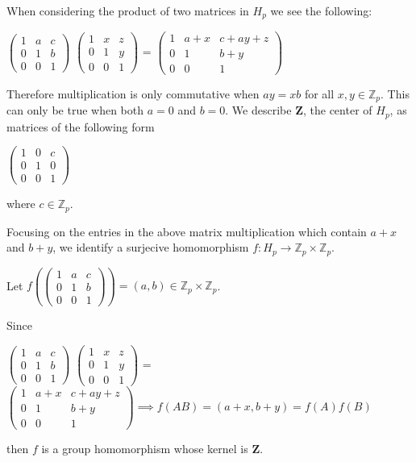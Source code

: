 \documentclass{article}
\theoremstyle{plain} %
\theoremstyle{definition} %
\newcommand{\bZ}{\mathbb{Z}}
\newcommand{\fZ}{\mathbf{Z}}
\begin{document}
When considering the product of two matrices in $H_p$ we see the following:
\begin{center}
    $\begin{pmatrix}
        1 & a & c \\
        0 & 1 & b \\
        0 & 0 & 1
    \end{pmatrix}$
    $\begin{pmatrix}
        1 & x & z \\
        0 & 1 & y \\
        0 & 0 & 1
    \end{pmatrix}$ =
    $\begin{pmatrix}
        1 & a+x & c+ay+z \\
        0 & 1 & b+y \\
        0 & 0 & 1
    \end{pmatrix}$ 
\end{center}
Therefore multiplication is only commutative when $ay=xb$ for all $x,y \in \bZ_p$. 
This can only be true when both $a=0$ and $b=0$.
We describe $\fZ$, the center of $H_p$, as matrices of the following form
\begin{center}
    $\begin{pmatrix}
        1 & 0 & c \\
        0 & 1 & 0 \\
        0 & 0 & 1
    \end{pmatrix}$
\end{center}
where $c \in \bZ_p$. 

Focusing on the entries in the above matrix multiplication which contain $a+x$ and $b+y$, we 
identify a surjecive homomorphism $f: H_p \to \bZ_p \times \bZ_p$.

Let $f\left(
    \begin{pmatrix}
        1 & a & c \\
        0 & 1 & b \\
        0 & 0 & 1
    \end{pmatrix}\right) = (a,b) \in \bZ_p \times \bZ_p$.

Since 
\begin{center}
    $\begin{pmatrix}
        1 & a & c \\
        0 & 1 & b \\
        0 & 0 & 1
    \end{pmatrix}$
    $\begin{pmatrix}
        1 & x & z \\
        0 & 1 & y \\
        0 & 0 & 1
    \end{pmatrix}$ =
    $\begin{pmatrix}
        1 & a+x & c+ay+z \\
        0 & 1 & b+y \\
        0 & 0 & 1
    \end{pmatrix} \implies f(AB) = (a+x, b+y) = f(A)f(B)$ 
\end{center}
then $f$ is a group homomorphism whose kernel is $\fZ$.
\end{document}
